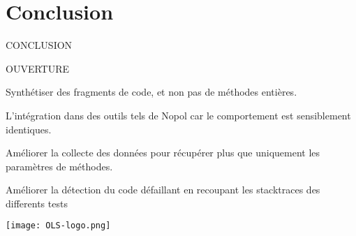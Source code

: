 \chapter*{Conclusion}
	\thispagestyle{conclusion}
	
	
\par CONCLUSION
	
	
\par OUVERTURE	
\par Synthétiser des fragments de code, et non pas de méthodes entières.
\par L'intégration dans des outils tels de Nopol car le comportement est sensiblement identiques.
\par Améliorer la collecte des données pour récupérer plus que uniquement les paramètres de méthodes. 
\par Améliorer la détection du code défaillant en recoupant les stacktraces des differents tests

\begin{center}
	\texttt{[image: OLS-logo.png]}
\end{center}
	
	

